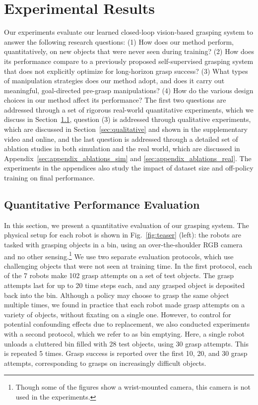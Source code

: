 \documentclass{article}
\begin{document}
\section{Experimental Results}
\label{sec:experiments}

Our experiments evaluate our learned closed-loop vision-based grasping system to answer the following research questions: (1) How does our method perform, quantitatively, on new objects that were never seen during training? (2) How does its performance compare to a previously proposed self-supervised grasping system that does not explicitly optimize for long-horizon grasp success? (3) What types of manipulation strategies does our method adopt, and does it carry out meaningful, goal-directed pre-grasp manipulations? 
(4) How do the various design choices in our method affect its performance? The first two questions are addressed through a set of rigorous real-world quantitative experiments, which we discuss in Section~\ref{sec:quantitative}, question (3) is addressed through qualitative experiments, which are discussed in Section~\ref{sec:qualitative} and shown in the supplementary video and online,
and the last question is addressed through a detailed set of ablation studies in both simulation and the real world, which are discussed in Appendix~\ref{sec:appendix_ablations_sim} and \ref{sec:appendix_ablations_real}. The experiments in the appendices also study the impact of dataset size and off-policy training on final performance.

\subsection{Quantitative Performance Evaluation}
\label{sec:quantitative}

In this section, we present a quantitative evaluation of our grasping system. The physical setup for each robot is shown in Fig.~\ref{fig:teaser} (left): the robots are tasked with grasping objects in a bin, using an over-the-shoulder RGB camera and no other sensing.\footnote{Though some of the figures show a wrist-mounted camera, this camera is not used in the experiments.} We use two separate evaluation protocols, which use challenging objects that were not seen at training time. In the first protocol, each of the 7 robots make 102 grasp attempts on a set of test objects. The grasp attempts last for up to 20 time steps each, and any grasped object is deposited back into the bin. Although a policy may choose to grasp the same object multiple times, we found in practice that each robot made grasp attempts on a variety of objects, without fixating on a single one. However, to control for potential confounding effects due to replacement, we also conducted experiments with a second protocol, which we refer to as bin emptying. Here, a single robot unloads a cluttered bin filled with 28 test objects,
using 30 grasp attempts. This is repeated 5 times. Grasp success is reported over the first 10, 20, and 30 grasp attempts, corresponding to grasps on increasingly difficult objects.
\end{document}
